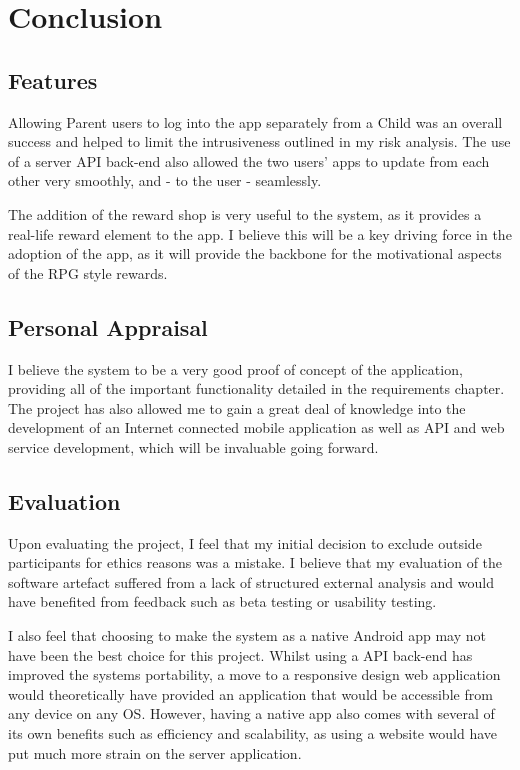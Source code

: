 \chapter{Conclusion}
\section{Features}
Allowing Parent users to log into the app separately from a Child was an overall success and helped to limit the intrusiveness outlined in my risk analysis.
The use of a server API back-end also allowed the two users' apps to update from each other very smoothly, and - to the user - seamlessly.

The addition of the reward shop is very useful to the system, as it provides a real-life reward element to the app.
I believe this will be a key driving force in the adoption of the app, as it will provide the backbone for the motivational aspects of the RPG style rewards.

\section{Personal Appraisal}
I believe the system to be a very good proof of concept of the application, providing all of the important functionality detailed in the requirements chapter.
The project has also allowed me to gain a great deal of knowledge into the development of an Internet connected mobile application as well as API and web service development, which will be invaluable going forward.

\section{Evaluation}
Upon evaluating the project, I feel that my initial decision to exclude outside participants for ethics reasons was a mistake. 
I believe that my evaluation of the software artefact suffered from a lack of structured external analysis and would have benefited from feedback such as beta testing or usability testing. 

I also feel that choosing to make the system as a native Android app may not have been the best choice for this project.
Whilst using a API back-end has improved the systems portability, a move to a responsive design web application would theoretically have provided an application that would be accessible from any device on any OS.
However, having a native app also comes with several of its own benefits such as efficiency and scalability, as using a website would have put much more strain on the server application.

